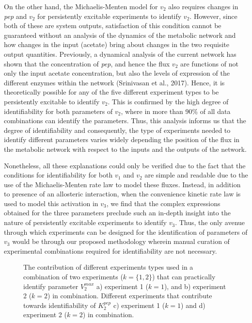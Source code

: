 \documentclass[10pt]{article}
\begin{document}
On the other hand, the Michaelis-Menten model for $v_2$ also requires changes in \textit{pep} and $v_2$ for persistently excitable experiments to identify $v_2$. However, since both of these are system outputs, satisfaction of this condition cannot be guaranteed without an analysis of the dynamics of the metabolic network and how changes in the input (acetate) bring about changes in the two requisite output quantities. Previously, a dynamical analysis of the current network has shown that the concentration of \textit{pep}, and hence the flux $v_2$ are functions of not only the input acetate concentration, but also the levels of expression of the different enzymes within the network (Srinivasan et al., 2017). Hence, it is theoretically possible for any of the five different experiment types to be persistently excitable to identify $v_2$. This is confirmed by the high degree of identifiability for both parameters of $v_2$, where in more than 90\% of all data combinations can identify the parameters.
Thus, this analysis informs us that the degree of identifiability and consequently, the type of experiments needed to identify different parameters varies widely depending the position of the flux in the metabolic network with respect to the inputs and the outputs of the network. 

Nonetheless, all these explanations could only be verified due to the fact that the conditions for identifiability for both $v_1$ and $v_2$ are simple and readable due to the use of the Michaelis-Menten rate law to model these fluxes. Instead, in addition to presence of an allosteric interaction, when the convenience kinetic rate law is used to model this activation in $v_3$, we find that the complex expressions obtained for the three parameters preclude such an in-depth insight into the nature of persistently excitable experiments to identify  $v_3$. Thus, the only avenue through which experiments can be designed for the identification of parameters of $v_3$ would be through our proposed methodology wherein manual curation of experimental combinations required for identifiability are not necessary. 

\begin{figure}[!tbhp]
	\caption{The contribution of different experiments types used in a combination of two experiments ($k = \{1, 2\}$) that can practically identify parameter $V_2^{max}$ a) experiment 1 ($k=1$), and b) experiment 2 ($k=2$) in combination. Different experiments that contribute towards identifiability of $K_2^{pep}$ c) experiment 1 ($k=1$) and d) experiment 2 ($k=2$) in combination.}\label{fig:figure3}
\end{figure}
\end{document}
